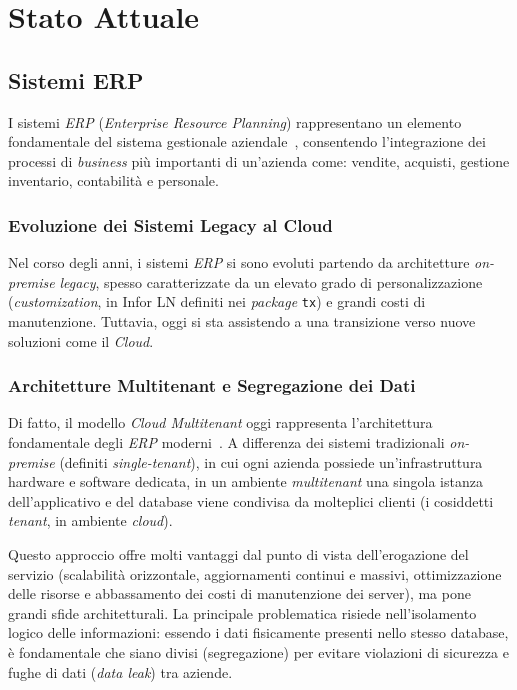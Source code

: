 ﻿\chapter{Stato Attuale}\label{ch:stato-attuale}


\section{Sistemi ERP}\label{sec:sistemi-erp}
I sistemi \textit{ERP} (\textit{Enterprise Resource Planning}) rappresentano un elemento fondamentale del sistema gestionale aziendale~\cite{erpMigration},
consentendo l'integrazione dei processi di \textit{business} più importanti di un'azienda come: vendite, acquisti, gestione inventario, contabilità e personale.

\subsection{Evoluzione dei Sistemi Legacy al Cloud}\label{subsec:evoluzione-dei-sistemi-legacy-al-cloud}
Nel corso degli anni, i sistemi \textit{ERP} si sono evoluti partendo da architetture \textit{on-premise} \textit{legacy}, spesso caratterizzate da un elevato
grado di personalizzazione (\textit{customization}, in Infor LN definiti nei \textit{package} \texttt{tx}) e grandi costi di manutenzione.
Tuttavia, oggi si sta assistendo a una transizione verso nuove soluzioni come il \textit{Cloud}.

\subsection{Architetture Multitenant e Segregazione dei Dati}\label{subsec:architetture-multitenant-e-segregazione-dei-dati}
Di fatto, il modello \textit{Cloud Multitenant} oggi rappresenta l'architettura fondamentale degli \textit{ERP} moderni~\cite{multitenantCloud}.
A differenza dei sistemi tradizionali \textit{on-premise} (definiti \textit{single-tenant}), in cui ogni azienda possiede un'infrastruttura hardware e software
dedicata, in un ambiente \textit{multitenant} una singola istanza dell'applicativo e del database viene condivisa da molteplici clienti (i cosiddetti \textit{tenant}, in ambiente \textit{cloud}).

Questo approccio offre molti vantaggi dal punto di vista dell'erogazione del servizio (scalabilità orizzontale, aggiornamenti continui e massivi,
ottimizzazione delle risorse e abbassamento dei costi di manutenzione dei server), ma pone grandi sfide architetturali.
La principale problematica risiede nell'isolamento logico delle informazioni: essendo i dati fisicamente presenti nello
stesso database, è fondamentale che siano divisi (segregazione) per evitare violazioni di sicurezza e
fughe di dati (\textit{data leak}) tra aziende.

